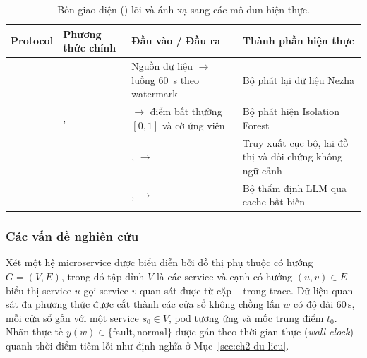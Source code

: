 \begin{table}[H]
  \centering
  \caption{Bốn giao diện () lõi và ánh xạ sang các mô-đun hiện thực.}
  \label{tab:ch4-protocols}
  \tblfont
  \tblsetup
  \setlength{\tabcolsep}{4pt}
  \begin{tabularx}{\linewidth}{|l|>{\raggedright\arraybackslash}p{3.0cm}|Y|>{\raggedright\arraybackslash}p{3.7cm}|}
    \hline
    \textbf{Protocol} & \textbf{Phương thức chính} & \textbf{Đầu vào / Đầu ra} & \textbf{Thành phần hiện thực} \\
    \hline
     &  & Nguồn dữ liệu $\to$ luồng  60~s theo watermark & Bộ phát lại dữ liệu Nezha \\
    \hline
     & ,  &  $\to$ điểm bất thường $[0, 1]$ và cờ ứng viên & Bộ phát hiện Isolation Forest \\
    \hline
     &  & ,  $\to$  & Truy xuất  cục bộ,  lai đồ thị và đối chứng không ngữ cảnh \\
    \hline
     &  & ,  $\to$  & Bộ thẩm định LLM qua cache bất biến \\
    \hline
  \end{tabularx}
\end{table}

\subsubsection{Các vấn đề nghiên cứu}
\label{sec:ch4-van-de}

Xét một hệ microservice được biểu diễn bởi đồ thị phụ thuộc có hướng $G = (V, E)$, trong đó tập đỉnh $V$ là các service và cạnh có hướng $(u, v) \in E$ biểu thị service $u$ gọi service $v$ quan sát được từ cặp -- trong trace. Dữ liệu quan sát đa phương thức được cắt thành các cửa sổ không chồng lấn $w$ có độ dài $60\,\text{s}$, mỗi cửa sổ gắn với một service $s_0 \in V$, pod tương ứng và mốc trung điểm $t_0$. Nhãn thực tế $y(w) \in \{\text{fault}, \text{normal}\}$ được gán theo thời gian thực (\emph{wall-clock}) quanh thời điểm tiêm lỗi như định nghĩa ở Mục~\ref{sec:ch2-du-lieu}.

